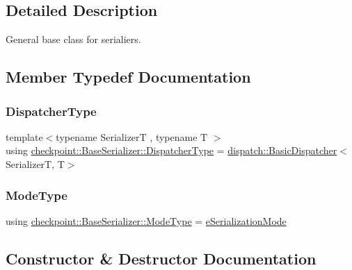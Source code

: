 \subsection{Detailed Description}
General base class for serialiers. 

\subsection{Member Typedef Documentation}
\mbox{\label{structcheckpoint_1_1_base_serializer_a6e98a837a89de1750749e4ef8742489c}} 
\subsubsection{\texorpdfstring{Dispatcher\+Type}{DispatcherType}}
{\footnotesize\ttfamily template$<$typename SerializerT , typename T $>$ \\
using \hyperlink{structcheckpoint_1_1_base_serializer_a6e98a837a89de1750749e4ef8742489c}{checkpoint\+::\+Base\+Serializer\+::\+Dispatcher\+Type} =  \hyperlink{structcheckpoint_1_1dispatch_1_1_basic_dispatcher}{dispatch\+::\+Basic\+Dispatcher}$<$SerializerT, T$>$}

\mbox{\label{structcheckpoint_1_1_base_serializer_aaa856a02f204d9c3892810b87671b3e9}} 
\subsubsection{\texorpdfstring{Mode\+Type}{ModeType}}
{\footnotesize\ttfamily using \hyperlink{namespacecheckpoint_ae2509499ccd8b1dc48fb535bf8aa3059}{checkpoint\+::\+Base\+Serializer\+::\+Mode\+Type} =  \hyperlink{namespacecheckpoint_ae2509499ccd8b1dc48fb535bf8aa3059}{e\+Serialization\+Mode}}



\subsection{Constructor \& Destructor Documentation}
\mbox{\label{structcheckpoint_1_1_base_serializer_a54ef6d9ab0a03d637822dcdacd146763}} 
